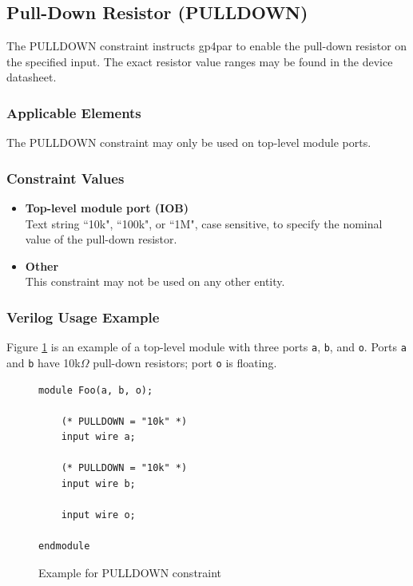 \documentclass[11pt]{article}
\begin{document}

\pagebreak
\subsection{Pull-Down Resistor (PULLDOWN)}

The PULLDOWN constraint instructs gp4par to enable the pull-down resistor on the specified input. The exact resistor 
value ranges may be found in the device datasheet.

\subsubsection{Applicable Elements}
The PULLDOWN constraint may only be used on top-level module ports. 

\subsubsection{Constraint Values}
\begin{itemize}
\item {\bfseries Top-level module port (IOB)}\\
Text string ``10k", ``100k", or ``1M", case sensitive, to specify the nominal value of the pull-down resistor.
\item {\bfseries Other} \\
This constraint may not be used on any other entity.
\end{itemize}

\subsubsection{Verilog Usage Example}

Figure \ref{constraint-pulldown} is an example of a top-level module with three ports \texttt{a}, \texttt{b}, and
\texttt{o}. Ports \texttt{a} and \texttt{b} have 10k$\Omega$ pull-down resistors; port \texttt{o} is floating.

\begin{figure}[h]
\begin{lstlisting}
module Foo(a, b, o);

	(* PULLDOWN = "10k" *)
	input wire a;

	(* PULLDOWN = "10k" *)
	input wire b;

	input wire o;
	
endmodule
\end{lstlisting}
\caption{Example for PULLDOWN constraint}
\label{constraint-pulldown}
\end{figure}
\end{document}
